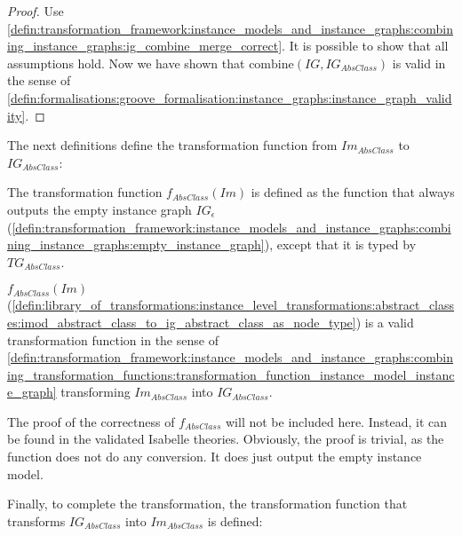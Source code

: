 \begin{proof}
Use \cref{defin:transformation_framework:instance_models_and_instance_graphs:combining_instance_graphs:ig_combine_merge_correct}. It is possible to show that all assumptions hold. Now we have shown that $\mathrm{combine}(IG, IG_{AbsClass})$ is valid in the sense of \cref{defin:formalisations:groove_formalisation:instance_graphs:instance_graph_validity}.
\end{proof}

The next definitions define the transformation function from $Im_{AbsClass}$ to $IG_{AbsClass}$:

\begin{defin}
\label{defin:library_of_transformations:instance_level_transformations:abstract_classes:imod_abstract_class_to_ig_abstract_class_as_node_type}
The transformation function $f_{AbsClass}(Im)$ is defined as the function that always outputs the empty instance graph $IG_\epsilon$ (\cref{defin:transformation_framework:instance_models_and_instance_graphs:combining_instance_graphs:empty_instance_graph}), except that it is typed by $TG_{AbsClass}$.
\end{defin}

\begin{thm}
\label{defin:library_of_transformations:instance_level_transformations:abstract_classes:imod_abstract_class_to_ig_abstract_class_as_node_type_func}
$f_{AbsClass}(Im)$ (\cref{defin:library_of_transformations:instance_level_transformations:abstract_classes:imod_abstract_class_to_ig_abstract_class_as_node_type}) is a valid transformation function in the sense of \cref{defin:transformation_framework:instance_models_and_instance_graphs:combining_transformation_functions:transformation_function_instance_model_instance_graph} transforming $Im_{AbsClass}$ into $IG_{AbsClass}$.
\end{thm}

The proof of the correctness of $f_{AbsClass}$ will not be included here. Instead, it can be found in the validated Isabelle theories. Obviously, the proof is trivial, as the function does not do any conversion. It does just output the empty instance model.

Finally, to complete the transformation, the transformation function that transforms $IG_{AbsClass}$ into $Im_{AbsClass}$ is defined:

